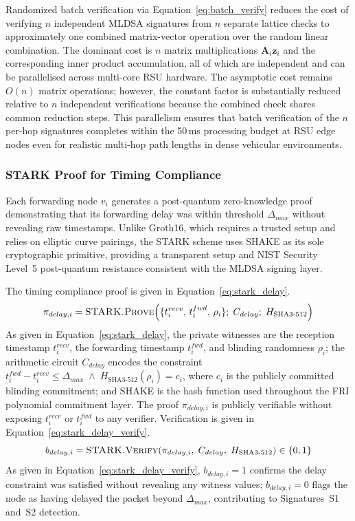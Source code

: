 \documentclass[12pt, a4paper]{report}
\begin{document}
Randomized batch verification via
Equation~\eqref{eq:batch_verify} reduces the cost
of verifying $n$ independent \ac{MLDSA} signatures
from $n$ separate lattice checks to approximately
one combined matrix-vector operation over the random
linear combination. The dominant cost is $n$ matrix
multiplications $\mathbf{A}_i \mathbf{z}_i$ and the
corresponding inner product accumulation, all of which
are independent and can be parallelised across
multi-core \ac{RSU} hardware. The asymptotic cost
remains $O(n)$ matrix operations; however, the
constant factor is substantially reduced relative
to $n$ independent verifications because the combined
check shares common reduction steps. This parallelism
ensures that batch verification of the $n$ per-hop
signatures completes within the 50\,ms processing
budget at \ac{RSU} edge nodes even for realistic
multi-hop path lengths in dense vehicular environments.



\subsubsection{STARK Proof for Timing Compliance}

Each forwarding node $v_i$ generates a post-quantum
zero-knowledge proof demonstrating that its forwarding
delay was within threshold $\Delta_{max}$ without
revealing raw timestamps. Unlike Groth16, which requires
a trusted setup and relies on elliptic curve pairings,
the \ac{STARK} scheme uses \ac{SHAKE} as its sole
cryptographic primitive, providing a transparent setup
and NIST Security Level~5 post-quantum resistance
consistent with the \ac{MLDSA} signing layer.

The timing compliance proof is given in
Equation~\eqref{eq:stark_delay}.
\begin{equation}
\pi_{delay,i} = \textsc{STARK.Prove}\!\left(
\{t^{recv}_i,\, t^{fwd}_i,\, \rho_i\};\;
C_{delay};\;
H_{\text{SHA3-512}}
\right)
\label{eq:stark_delay}
\end{equation}
As given in Equation~\eqref{eq:stark_delay}, the
private witnesses are the reception timestamp
$t^{recv}_i$, the forwarding timestamp $t^{fwd}_i$,
and blinding randomness $\rho_i$; the arithmetic
circuit $C_{delay}$ encodes the constraint
$t^{fwd}_i - t^{recv}_i \leq \Delta_{max}
\;\land\; H_{\text{SHA3-512}}(\rho_i) = c_i$,
where $c_i$ is the publicly committed blinding
commitment; and \ac{SHAKE} is the hash function
used throughout the FRI polynomial commitment layer.
The proof $\pi_{delay,i}$ is publicly verifiable
without exposing $t^{recv}_i$ or $t^{fwd}_i$ to
any verifier. Verification is given in
Equation~\eqref{eq:stark_delay_verify}.
\begin{equation}
b_{delay,i} = \textsc{STARK.Verify}\!\left(
\pi_{delay,i},\; C_{delay},\;
H_{\text{SHA3-512}}
\right) \in \{0, 1\}
\label{eq:stark_delay_verify}
\end{equation}
As given in Equation~\eqref{eq:stark_delay_verify},
$b_{delay,i} = 1$ confirms the delay constraint was
satisfied without revealing any witness values;
$b_{delay,i} = 0$ flags the node as having delayed
the packet beyond $\Delta_{max}$, contributing to
Signatures~S1 and~S2 detection.
\end{document}
